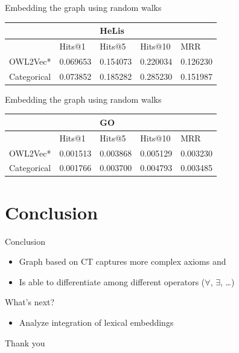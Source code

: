 \documentclass[bigger]{beamer}
\begin{document}
\begin{frame}[label={sec:org6eae395}]{Embedding the graph using random walks}
\begin{center}
\begin{tabular}{lllll}
 &  & HeLis &  & \\
\hline
 & Hits@1 & Hits@5 & Hits@10 & MRR\\
\hline
OWL2Vec* & 0.069653 & 0.154073 & 0.220034 & 0.126230\\
Categorical & \alert{0.073852} & \alert{0.185282} & \alert{0.285230} & \alert{0.151987}\\
\end{tabular}
\end{center}
\end{frame}

\begin{frame}[label={sec:orgdbd4831}]{Embedding the graph using random walks}
\begin{center}
\begin{tabular}{lllll}
\hline
 &  & GO &  & \\
\hline
 & Hits@1 & Hits@5 & Hits@10 & MRR\\
\hline
OWL2Vec* & 0.001513 & \alert{0.003868} & \alert{0.005129} & 0.003230\\
Categorical & \alert{0.001766} & 0.003700 & 0.004793 & \alert{0.003485}\\
\hline
\end{tabular}
\end{center}
\end{frame}

\section{Conclusion}
\label{sec:orgf8178ac}

\begin{frame}[label={sec:orgb6a73b3}]{Conclusion}
\begin{itemize}
\item Graph based on CT captures more complex axioms and
\item Is able to differentiate among different operators (\(\forall\), \(\exists\), \ldots{})
\end{itemize}
\end{frame}

\begin{frame}[label={sec:orgec0a86e}]{What's next?}
\begin{itemize}
\item Analyze integration of lexical embeddings
\end{itemize}
\end{frame}

\begin{frame}[label={sec:org5cff5d7}]{}
\centering
\LARGE Thank you
\end{frame}
\end{document}
